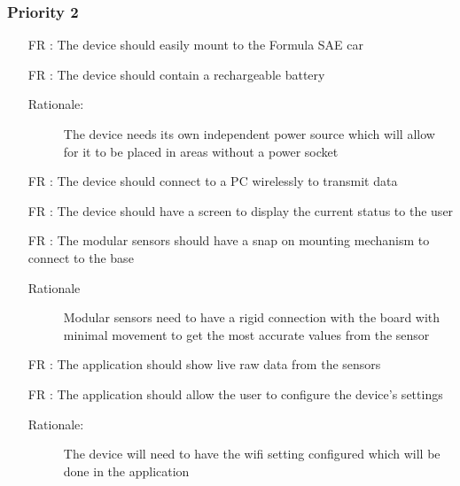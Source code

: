 \documentclass[12pt]{article}
\newcounter{reqnum} %
\begin{document}
\newpage

\subsubsection{Priority 2}
\begin{itemize}

  \item[FR \refstepcounter{reqnum}\thereqnum:] The device should easily mount to the Formula SAE car

  \item[FR \refstepcounter{reqnum}\thereqnum:] The device should contain a rechargeable battery
  \begin{description} \item[Rationale:] The device needs its own independent power source which will allow for it to be placed in areas without a power socket \end{description}

  \item[FR \refstepcounter{reqnum}\thereqnum:] The device should connect to a PC wirelessly to transmit data

  \item[FR \refstepcounter{reqnum}\thereqnum:] The device should have a screen to display the current status to the user
  
  \item[FR \refstepcounter{reqnum}\thereqnum:] The modular sensors should have a snap on mounting mechanism to connect to the base
  \begin{description} \item[Rationale] Modular sensors need to have a rigid connection with the board with minimal movement to get the most accurate values from the sensor  \end{description}

  \item[FR \refstepcounter{reqnum}\thereqnum:] The application should show live raw data from the sensors
  
  \item[FR \refstepcounter{reqnum}\thereqnum:] The application should allow the user to configure the device's settings
  \begin{description} \item[Rationale:] The device will need to have the wifi setting configured which will be done in the application \end{description}
  
  \end{itemize}
\end{document}
